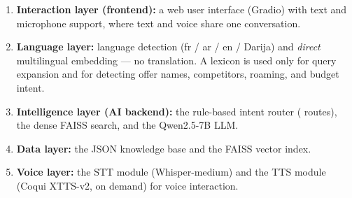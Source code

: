 \documentclass[12pt, a4paper]{report}
\newcommand{\humantext}[1]{#1}      %
\begin{document}
\begin{enumerate}
    \item \humantext{\textbf{Interaction layer (frontend):} a web user interface (Gradio) with text and microphone support, where text and voice share one conversation.}
    \item \humantext{\textbf{Language layer:} language detection (fr / ar / en / Darija) and \emph{direct} multilingual embedding --- no translation. A lexicon is used only for query expansion and for detecting offer names, competitors, roaming, and budget intent.}
    \item \humantext{\textbf{Intelligence layer (AI backend):} the rule-based intent router (\numRoutes{} routes), the dense FAISS search, and the Qwen2.5-7B LLM.}
    \item \humantext{\textbf{Data layer:} the JSON knowledge base and the FAISS vector index.}
    \item \humantext{\textbf{Voice layer:} the STT module (Whisper-medium) and the TTS module (Coqui XTTS-v2, on demand) for voice interaction.}
\end{enumerate}
\end{document}
